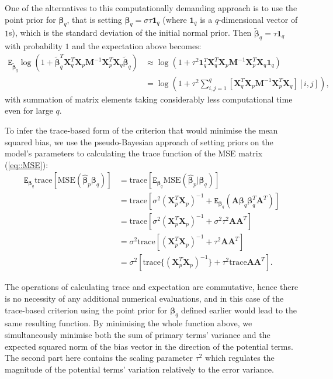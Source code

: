 One of the alternatives to this computationally demanding approach is to use the point prior for $\bm{\beta}_q$, that is setting  $\bm{\beta}_q=\sigma\tau\bm{1}_q$ (where $\bm{1}_q$ is a $q$-dimensional vector of $1$s), which is the standard deviation  of the initial normal prior. Then $\bm{\tilde{\beta}}_q = \tau\bm{1}_q$ with probability $1$ and the expectation above becomes:
\begin{align*}
\mathtt{E}_{\bm{\tilde{\beta}}_q}\log(1+\bm{\tilde{\beta}}_q^T\bm{X}_q^{T}\bm{X}_p\bm{M}^{-1}\bm{X}_p^{T}\bm{X}_q\bm{\tilde{\beta}}_q)  &\approx \log(1+\tau^2\bm{1}^T_q\bm{X}_q^{T}\bm{X}_p\bm{M}^{-1}\bm{X}_p^{T}\bm{X}_q\bm{1}_q) \\&=\log(1+\tau^2\sum_{i,j=1}^{q}[\bm{X}_q^{T}\bm{X}_p\bm{M}^{-1}\bm{X}_p^{T}\bm{X}_q][i,j]),
\end{align*}
with summation of matrix elements taking considerably less computational time even for large $q$. 
 
To infer the trace-based form of the criterion that would minimise the mean squared bias, we use the pseudo-Bayesian approach of setting priors on the model's parameters  to calculating the trace function of the MSE matrix (\ref{eq::MSE}): 
\begin{align*}
\mathtt{E}_{\bm{\beta}_q}\mbox{trace}[\mbox{MSE}(\bm{\hat{\beta}}_p\bm{\beta}_q)]&=\mbox{trace}[\mathtt{E}_{\bm{\beta}_q}\mbox{MSE}(\bm{\hat{\beta}}_p|\bm{\beta}_q)]\\&=\mbox{trace}[\sigma^2(\bm{X}_p^{T}\bm{X}_p)^{-1} + \mathtt{E}_{\bm{\beta}_q}(\bm{A}\bm{\beta}_q\bm{\beta}_q^T\bm{A}^T)]\\&=\mbox{trace}[\sigma^2(\bm{X}_p^{T}\bm{X}_p)^{-1}+\sigma^2\tau^2\bm{A}\bm{A}^T]\\&=\sigma^2\mbox{trace}[(\bm{X}_p^{T}\bm{X}_p)^{-1}+\tau^2\bm{A}\bm{A}^T]\\&=\sigma^2[\mbox{trace}\{(\bm{X}_p^{T}\bm{X}_p)^{-1}\}+\tau^2\mbox{trace}\bm{A}\bm{A}^T].
\end{align*}

The operations of calculating trace and expectation are commutative, hence there is no necessity of any additional numerical evaluations, and in this case of the trace-based criterion using the point prior for $\bm{\beta}_q$ defined earlier would lead to the same resulting function. By minimising the whole function above, we simultaneously minimise both the sum of primary terms' variance and the expected squared norm of the bias vector in the direction of the potential terms. The second part here contains the scaling parameter $\tau^2$ which regulates the magnitude of the potential terms' variation relatively to the error variance.  
 
